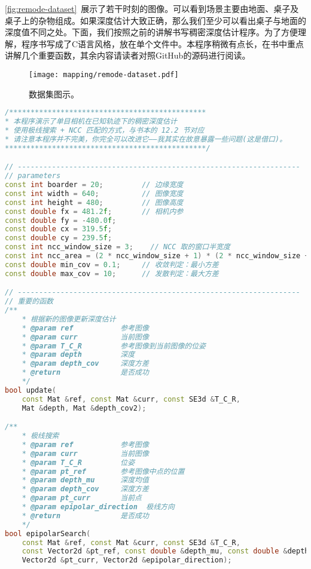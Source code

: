 \autoref{fig:remode-dataset}~展示了若干时刻的图像。可以看到场景主要由地面、桌子及桌子上的杂物组成。如果深度估计大致正确，那么我们至少可以看出桌子与地面的深度值不同之处。下面，我们按照之前的讲解书写稠密深度估计程序。为了方便理解，程序书写成了C语言风格，放在单个文件中。本程序稍微有点长，在书中重点讲解几个重要函数，其余内容请读者对照GitHub的源码进行阅读。

\begin{figure}[!ht]
	\centering
	\texttt{[image: mapping/remode-dataset.pdf]}
	\caption{数据集图示。}
	\label{fig:remode-dataset}
\end{figure}

\begin{lstlisting}[language=c++,caption=slambook2/ch12/dense\_monocular/dense\_mapping.cpp（片段）]
/**********************************************
* 本程序演示了单目相机在已知轨迹下的稠密深度估计
* 使用极线搜索 + NCC 匹配的方式，与书本的 12.2 节对应
* 请注意本程序并不完美，你完全可以改进它——我其实在故意暴露一些问题(这是借口)。
***********************************************/

// ------------------------------------------------------------------
// parameters
const int boarder = 20;         // 边缘宽度
const int width = 640;          // 图像宽度
const int height = 480;         // 图像高度
const double fx = 481.2f;       // 相机内参
const double fy = -480.0f;
const double cx = 319.5f;
const double cy = 239.5f;
const int ncc_window_size = 3;    // NCC 取的窗口半宽度
const int ncc_area = (2 * ncc_window_size + 1) * (2 * ncc_window_size + 1); // NCC窗口面积
const double min_cov = 0.1;     // 收敛判定：最小方差
const double max_cov = 10;      // 发散判定：最大方差

// ------------------------------------------------------------------
// 重要的函数
/**
    * 根据新的图像更新深度估计
    * @param ref           参考图像
    * @param curr          当前图像
    * @param T_C_R         参考图像到当前图像的位姿
    * @param depth         深度
    * @param depth_cov     深度方差
    * @return              是否成功
    */
bool update(
    const Mat &ref, const Mat &curr, const SE3d &T_C_R,
    Mat &depth, Mat &depth_cov2);

/**
    * 极线搜索
    * @param ref           参考图像
    * @param curr          当前图像
    * @param T_C_R         位姿
    * @param pt_ref        参考图像中点的位置
    * @param depth_mu      深度均值
    * @param depth_cov     深度方差
    * @param pt_curr       当前点
    * @param epipolar_direction  极线方向
    * @return              是否成功
    */
bool epipolarSearch(
    const Mat &ref, const Mat &curr, const SE3d &T_C_R,
    const Vector2d &pt_ref, const double &depth_mu, const double &depth_cov,
    Vector2d &pt_curr, Vector2d &epipolar_direction);


\end{lstlisting}
